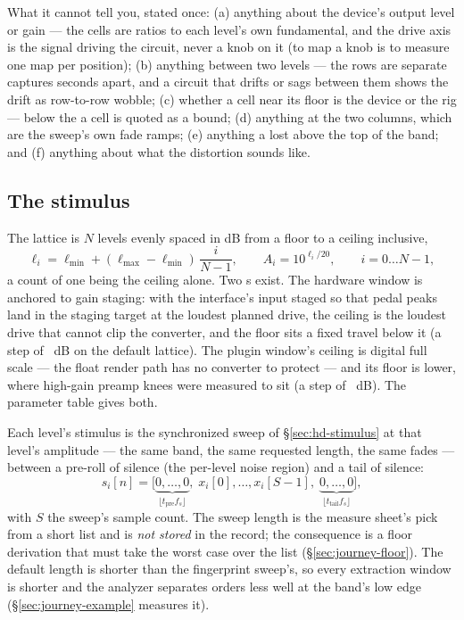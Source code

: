 \documentclass[11pt,a4paper]{article}
\begin{document}
What it cannot tell you, stated once: (a) anything about the device's
output level or gain --- the cells are ratios to each level's own
fundamental, and the drive axis is the signal driving the circuit, never a
knob on it (to map a knob is to measure one map per position); (b) anything
between two levels --- the rows are separate captures seconds apart, and a
circuit that drifts or sags between them shows the drift as row-to-row
wobble; (c) whether a cell near its floor is the device or the rig ---
below the  a cell is quoted as a bound; (d) anything
at the two  columns, which are the sweep's own fade ramps;
(e) anything a  lost above the top of the band; and
(f) anything about what the distortion sounds like.

\subsection{The stimulus}
\label{sec:journey-stimulus}
The lattice is $N$ levels evenly spaced in dB from a floor to a ceiling
inclusive,
\begin{equation}
  \ell_i = \ell_{\min} + (\ell_{\max} - \ell_{\min})\,\frac{i}{N - 1},
  \qquad A_i = 10^{\ell_i/20},\qquad i = 0 \ldots N-1,
  \label{eq:lattice}
\end{equation}
a count of one being the ceiling alone. Two s exist. The
hardware window is anchored to gain staging: with the interface's input
staged so that pedal peaks land in the staging target at the loudest
planned drive, the ceiling is the loudest drive that cannot clip the
converter, and the floor sits a fixed travel below it (a step of
\journeyHardwareStep\ dB on the default lattice). The plugin window's ceiling
is digital full scale --- the float render path has no converter to protect
--- and its floor is lower, where high-gain preamp knees were measured to
sit (a step of \journeyPluginStep\ dB). The parameter table gives both.

Each level's stimulus is the synchronized sweep of \S\ref{sec:hd-stimulus}
at that level's amplitude --- the same band, the same requested length, the
same fades --- between a pre-roll of silence (the per-level noise region)
and a tail of silence:
\begin{equation}
  s_i[n] = \big[\underbrace{0,\ldots,0}_{\lfloor t_{\mathrm{pre}} f_s\rfloor},\;
  x_i[0], \ldots, x_i[S-1],\;
  \underbrace{0,\ldots,0}_{\lfloor t_{\mathrm{tail}} f_s\rfloor}\big],
  \label{eq:journeystep}
\end{equation}
with $S$ the sweep's sample count. The sweep length is the measure
sheet's pick from a short list and is \emph{not stored} in the record;
the consequence is a floor derivation that must take the worst case over
the list (\S\ref{sec:journey-floor}). The default length is shorter than
the fingerprint sweep's, so every extraction window is shorter and the
analyzer separates orders less well at the band's low edge
(\S\ref{sec:journey-example} measures it).
\end{document}
